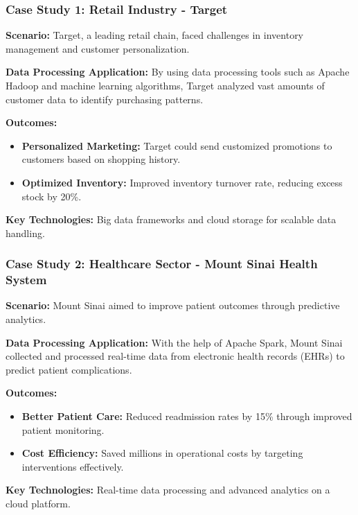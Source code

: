 \documentclass{beamer}
\begin{document}
\begin{frame}[fragile]
    \frametitle{Case Study 1: Retail Industry - Target}
    \textbf{Scenario:} Target, a leading retail chain, faced challenges in inventory management and customer personalization.

    \textbf{Data Processing Application:} By using data processing tools such as Apache Hadoop and machine learning algorithms, Target analyzed vast amounts of customer data to identify purchasing patterns.

    \textbf{Outcomes:}
    \begin{itemize}
        \item \textbf{Personalized Marketing:} Target could send customized promotions to customers based on shopping history.
        \item \textbf{Optimized Inventory:} Improved inventory turnover rate, reducing excess stock by 20\%.
    \end{itemize}

    \textbf{Key Technologies:} Big data frameworks and cloud storage for scalable data handling.
\end{frame}

\begin{frame}[fragile]
    \frametitle{Case Study 2: Healthcare Sector - Mount Sinai Health System}
    \textbf{Scenario:} Mount Sinai aimed to improve patient outcomes through predictive analytics.

    \textbf{Data Processing Application:} With the help of Apache Spark, Mount Sinai collected and processed real-time data from electronic health records (EHRs) to predict patient complications.

    \textbf{Outcomes:}
    \begin{itemize}
        \item \textbf{Better Patient Care:} Reduced readmission rates by 15\% through improved patient monitoring.
        \item \textbf{Cost Efficiency:} Saved millions in operational costs by targeting interventions effectively.
    \end{itemize}

    \textbf{Key Technologies:} Real-time data processing and advanced analytics on a cloud platform.
\end{frame}
\end{document}
